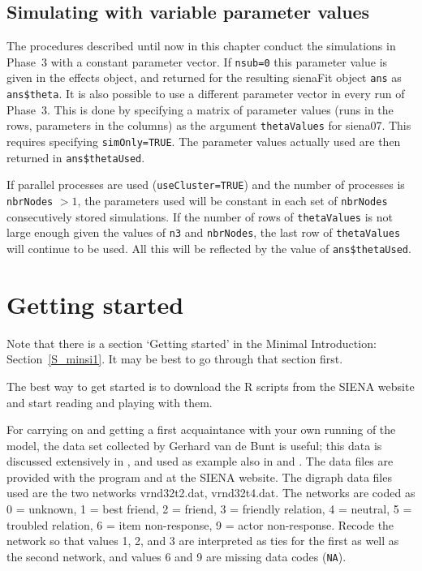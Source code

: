 \documentclass[a4paper,fleqn,11pt]{article}
\newcommand{\+}{\, + \,}
\newcommand{\R}{{\sf R }}
\newcommand{\SI}{{\sf SIENA }}
\begin{document}
\subsection{Simulating with variable parameter values}

The procedures described until now in this chapter conduct the simulations
in Phase~3 with a constant parameter vector.
If \texttt{nsub=0} this parameter value is given in the effects object,
and returned for the resulting \textsf{sienaFit} object \texttt{ans}
as \texttt{ans\$theta}.
It is also possible to use a different parameter vector in every
run of Phase~3. This is done by specifying a matrix of parameter
values (runs in the rows, parameters in the columns) as the
argument \texttt{thetaValues} for \textsf{siena07}.
This requires specifying \texttt{simOnly=TRUE}.
The parameter values actually used are then returned
in \texttt{ans\$thetaUsed}.

If parallel processes are used (\texttt{useCluster=TRUE})
and the number of processes is \texttt{nbrNodes} $ > 1$,
the parameters used will be constant in each set of \texttt{nbrNodes}
consecutively stored simulations.
If the number of rows of \texttt{thetaValues} is not large enough
given the values of \texttt{n3} and \texttt{nbrNodes},
the last row of \texttt{thetaValues} will continue to be used.
All this will be reflected by the value of \texttt{ans\$thetaUsed}.


\newpage
\section{Getting started}
\label{S_getting}

Note that there is a section `Getting started' in the Minimal
Introduction: Section~\ref{S_minsi1}. It may be best
to go through that section first.

The best way to get started is to download the \R scripts from the
\SI website and start reading and playing with them.

For carrying on and getting a first acquaintance with your own running
of the model, the data set collected by Gerhard van de Bunt
is useful; this data is discussed extensively in
\citet*{vanBunt99, vanBuntEA99},
and used as example also in \citet{Snijders01} and \citet{Snijders05}.
The data files are provided with the program
and at the \SI website. The digraph data files
used are the two networks {\sf vrnd32t2.dat}, {\sf vrnd32t4.dat}.
The networks are coded as 0 = unknown, 1 = best friend, 2 = friend,
3 = friendly relation, 4 = neutral, 5 = troubled relation, 6 = item
non-response, 9 = actor non-response.
Recode the network so that values 1, 2, and 3 are interpreted
as ties for the first as well as the second network, and values 6 and 9
are missing data codes (\texttt{NA}).
\end{document}
